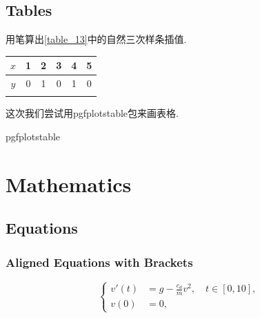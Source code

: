 \documentclass[a4paper, 12pt]{ctexart}
\let\oldtable\table
\let\oldendtable\endtable
\renewenvironment{table}
    {\par\nolinenumbers\oldtable}
    {\oldendtable\endnolinenumbers\par}
\theoremstyle{plain}
\theoremstyle{plain}
\theoremstyle{plain}
\theoremstyle{nonumberplain}
\begin{document}

    \subsection{Tables}

    用笔算出\ref{table_13}中的自然三次样条插值.
    \begin{table}[H]
        \begin{center}
            \caption{习题中给定的三次样条数据}
            \label{table_13}
            \begin{tabular}{cccccc}
                \Xhline{1.2pt}
                $x$ & 1 & 2 & 3 & 4 & 5\\
                \hline
                $y$ & 0 & 1 & 0 & 1 & 0\\
                \Xhline{1.2pt}
            \end{tabular}
        \end{center}
    \end{table}

    这次我们尝试用pgfplotstable包来画表格.
    \begin{table}[H]
        \begin{center}
            \caption{pgfplotstable}
        \end{center}
    \end{table}

    \section{Mathematics}

    \subsection{Equations}

    \subsubsection{Aligned Equations with Brackets}

    \begin{equation}
        \left\{
        \begin{aligned}
            v'(t) &= g - \frac{c_{d}}{m}v^{2},\quad t\in [0, 10],\\
            v(0) &= 0,
        \end{aligned}
        \right.
    \end{equation}
\end{document}
